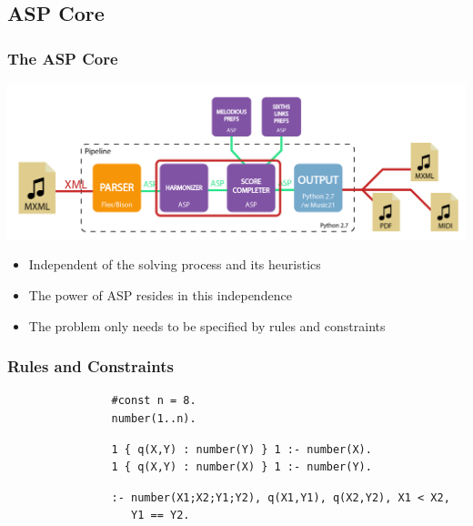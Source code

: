 \documentclass[english]{beamer}
\begin{document}
\subsection{ASP Core}
	\begin{frame}[t]
		\frametitle{The ASP Core}
		\begin{center}
		\includegraphics[width=0.6\linewidth]{imagenes/arch_trans/arquitectura_final_asp_core-01.png}
		\end{center}
		\begin{itemize}
			\item Independent of the solving process and its heuristics
			\item The power of ASP resides in this independence
			\item The problem only needs to be specified by rules and constraints
		\end{itemize}
	\end{frame}
	\begin{frame}[fragile]
		\frametitle{Rules and Constraints}
		\begin{example}
			\begin{verbatim}
				#const n = 8.
				number(1..n).
			\end{verbatim}
		\end{example}
		\begin{example}
			\begin{verbatim}
				1 { q(X,Y) : number(Y) } 1 :- number(X).
				1 { q(X,Y) : number(X) } 1 :- number(Y).
			\end{verbatim}
		\end{example}
		\begin{example}[Constraint]
			\begin{verbatim}
				:- number(X1;X2;Y1;Y2), q(X1,Y1), q(X2,Y2), X1 < X2,
				   Y1 == Y2.
			\end{verbatim}
		\end{example}
	\end{frame}
\end{document}
